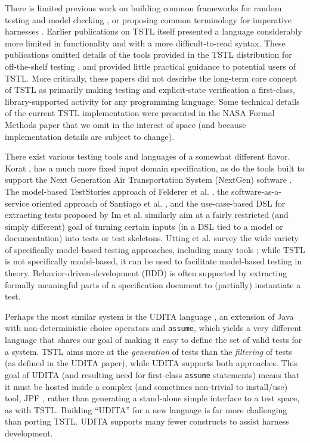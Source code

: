 There is limited previous work on
building common frameworks for random testing and model checking
\cite{woda08}, or proposing common terminology for imperative
harnesses \cite{woda12}.  Earlier publications on TSTL itself \cite{NFM15,ISSTA15} presented a
language considerably more limited in functionality and with a more
difficult-to-read syntax.  These publications omitted details of the tools provided in the TSTL distribution for
off-the-shelf testing \cite{tstl}, and provided little practical
guidance to potential users of TSTL.  More critically, these papers
did not descirbe the long-term core concept of TSTL as primarily
making testing and explicit-state verification
a first-class, library-supported activity for any programming
language.  Some technical
details of the current TSTL implementation were presented in the NASA
Formal Methods paper \cite{NFM15} that we omit in
the interest of space (and because implementation details are subject
to change).

There exist various testing tools and languages of a somewhat
different flavor.   Korat \cite{Korat}, has a much more fixed
input domain specification, as do the tools built to support the Next
Generation Air Transportation System (NextGen) software
\cite{TameInputs}. The model-based TestStories approach of Felderer et
al. \cite{TestStories}, the software-as-a-service oriented approach of
Santiago et al. \cite{Santiago}, and the use-case-based DSL for extracting tests
proposed by Im et al. \cite{AutoDSL} similarly aim at a fairly
restricted (and simply different) goal of turning certain inputs (in a DSL tied to a model or
documentation) into tests or test skeletons.  Utting et al. survey the wide variety of
specifically model-based testing approaches, including many tools
\cite{Taxonomy}; while TSTL is not specifically model-based, it can be
used to facilitate model-based testing in theory.
Behavior-driven-development (BDD) \cite{BDD} is often supported by extracting
formally meaningful parts of a specification document to (partially)
instantiate a test.  




Perhaps the most similar system is the UDITA language
\cite{UDITA}, an extension of Java with non-deterministic choice
operators and {\tt assume}, which yields a very different language
that shares our goal of making it easy to define the set of valid
tests for a system.  TSTL aims more at the \emph{generation} of
tests than the \emph{filtering} of tests (as defined in the UDITA
paper), while UDITA supports both approaches.  This goal of UDITA (and
resulting need for first-class {\tt assume} statements) means that it
must be hosted inside a complex (and sometimes non-trivial to
install/use) tool, JPF \cite{JPF2}, rather than generating a
stand-alone simple interface to a test space, as with TSTL.  Building
``UDITA'' for a new language is far more challenging than porting
TSTL.  UDITA supports many fewer constructs to assist harness
development.

